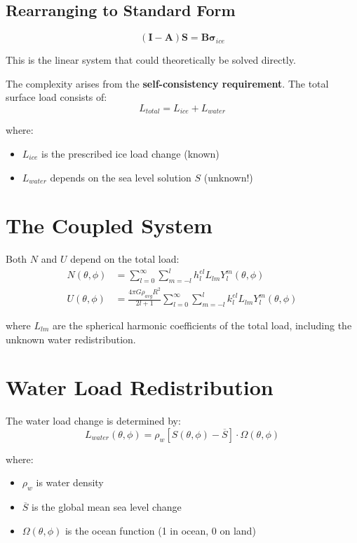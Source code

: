 \documentclass{article}
\begin{document}
\subsection{Rearranging to Standard Form}
\begin{equation}
(\mathbf{I} - \mathbf{A}) \mathbf{S} = \mathbf{B} \boldsymbol{\sigma}_{ice}
\end{equation}

This is the linear system that could theoretically be solved directly.

The complexity arises from the \textbf{self-consistency requirement}. The total surface load consists of:
\begin{equation}
L_{total} = L_{ice} + L_{water}
\end{equation}

where:
\begin{itemize}
\item $L_{ice}$ is the prescribed ice load change (known)
\item $L_{water}$ depends on the sea level solution $S$ (unknown!)
\end{itemize}

\section{The Coupled System}

Both $N$ and $U$ depend on the total load:
\begin{align}
N(\theta, \phi) &= \sum_{l=0}^{\infty} \sum_{m=-l}^{l} h_l^{el} L_{lm} Y_l^m(\theta, \phi) \\
U(\theta, \phi) &= \frac{4\pi G \rho_{avg} R^2}{2l+1} \sum_{l=0}^{\infty} \sum_{m=-l}^{l} k_l^{el} L_{lm} Y_l^m(\theta, \phi)
\end{align}

where $L_{lm}$ are the spherical harmonic coefficients of the total load, including the unknown water redistribution.

\section{Water Load Redistribution}

The water load change is determined by:
\begin{equation}
L_{water}(\theta, \phi) = \rho_w [S(\theta, \phi) - \overline{S}] \cdot \Omega(\theta, \phi)
\end{equation}

where:
\begin{itemize}
\item $\rho_w$ is water density
\item $\overline{S}$ is the global mean sea level change
\item $\Omega(\theta, \phi)$ is the ocean function (1 in ocean, 0 on land)
\end{itemize}
\end{document}
